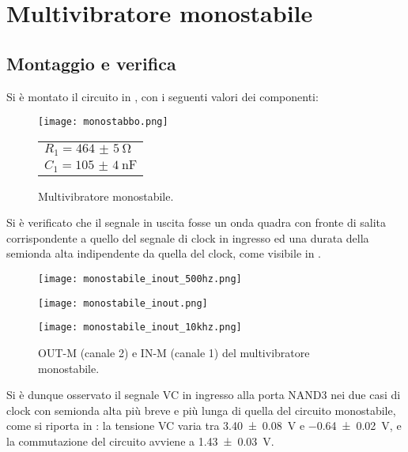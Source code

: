 \section{Multivibratore monostabile}
\subsection{Montaggio e verifica}

Si è montato il circuito in , con i seguenti valori dei componenti:

\begin{figure}[H]
	\begin{minipage}{0.8\textwidth}
		\centering
		\texttt{[image: monostabbo.png]}
		\caption{Multivibratore monostabile.}
		\label{monocazzo}
	\end{minipage}
	\begin{minipage}{0.1\textwidth}
		\begin{tabular}{l}
			$R_1 = \SI{464(5)}{\ohm}$\\
			$C_1 = \SI{105(4)}{\nano \farad}$
		\end{tabular}
	\end{minipage}
\end{figure}

Si è verificato che il segnale in uscita fosse un onda quadra con fronte
di salita corrispondente a quello del segnale di clock in ingresso ed una durata
della semionda alta indipendente da quella del clock, come visibile in .

\begin{figure}[H]
	\centering
	\begin{minipage}{0.3\textwidth}
		\texttt{[image: monostabile\_inout\_500hz.png]}
	\end{minipage}
	\begin{minipage}{0.3\textwidth}
		\centering
		\texttt{[image: monostabile\_inout.png]}
	\end{minipage}
	\begin{minipage}{0.3\textwidth}
		\centering
		\texttt{[image: monostabile\_inout\_10khz.png]}
	\end{minipage}
	\caption{OUT-M (canale 2) e IN-M (canale 1) del multivibratore monostabile.}
	\label{monoinout}
\end{figure}

Si è dunque osservato il segnale VC in ingresso alla porta NAND3 nei due casi di
clock con semionda alta più breve e più lunga di quella del circuito
monostabile, come si riporta in : la tensione VC varia tra \SI{3.40(8)}{\V} e \SI{-0.64(2)}{\V}, e la commutazione del circuito avviene a  \SI{1.43(3)}{\V}.

